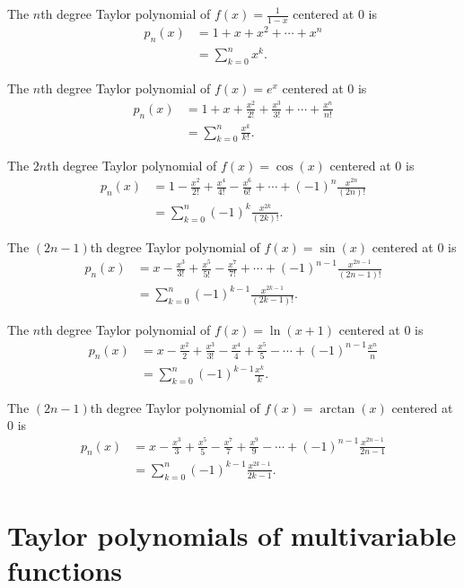 \documentclass{ximera}
\begin{document}
\begin{proposition}
The $n$th degree Taylor polynomial of $f(x) = \frac{1}{1-x}$ centered at $0$ is
\begin{align*}
p_n(x) &= 1 + x + x^2 + \cdots + x^n\\
&= \sum_{k=0}^n x^k.
\end{align*}

The $n$th degree Taylor polynomial of $f(x) = e^x$ centered at $0$ is
\begin{align*}
p_n(x) &= 1 + x + \frac{x^2}{2!} +\frac{x^3}{3!} + \cdots + \frac{x^n}{n!}\\
&= \sum_{k=0}^{n}\frac{x^k}{k!}.
\end{align*}

The $2n$th degree Taylor polynomial of $f(x) = \cos(x)$ centered at $0$ is
\begin{align*}
p_n(x) &= 1 - \frac{x^2}{2!} +\frac{x^4}{4!} - \frac{x^6}{6!} + \cdots + (-1)^n\frac{x^{2n}}{(2n)!}\\
&= \sum_{k=0}^{n} (-1)^k\frac{x^{2k}}{(2k)!}.
\end{align*}

The $(2n-1)$th degree Taylor polynomial of $f(x) = \sin(x)$ centered at $0$ is
\begin{align*}
p_n(x) &= x - \frac{x^3}{3!} +\frac{x^5}{5!} - \frac{x^7}{7!} + \cdots + (-1)^{n-1}\frac{x^{2n-1}}{(2n-1)!}\\
&= \sum_{k=0}^{n} (-1)^{k-1}\frac{x^{2k-1}}{(2k-1)!}.
\end{align*}

The $n$th degree Taylor polynomial of $f(x) = \ln(x+1)$ centered at $0$ is
\begin{align*}
p_n(x) &= x - \frac{x^2}{2} +\frac{x^3}{3!} - \frac{x^4}{4} + \frac{x^5}{5} - \cdots + (-1)^{n-1}\frac{x^n}{n}\\
&= \sum_{k=0}^{n}(-1)^{k-1}\frac{x^k}{k}.
\end{align*}

The $(2n-1)$th degree Taylor polynomial of $f(x) = \arctan(x)$ centered at $0$ is
\begin{align*}
p_n(x) &= x - \frac{x^3}{3} +\frac{x^5}{5} - \frac{x^7}{7} + \frac{x^9}{9} - \cdots + (-1)^{n-1}\frac{x^{2n-1}}{2n-1}\\
&= \sum_{k=0}^{n}(-1)^{k-1}\frac{x^{2k-1}}{2k-1}.
\end{align*}
\end{proposition}

\section*{Taylor polynomials of multivariable functions}
\end{document}
